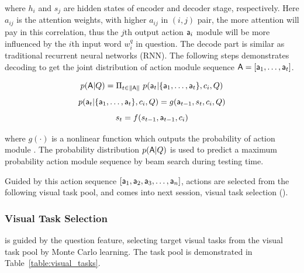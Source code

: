 \noindent where $h_i$ and $s_j$ are hidden states of encoder and decoder stage, respectively. Here $a_{ij}$ is the attention weights, with higher $a_{ij}$ in $(i, j)$ pair, the more attention will pay in this correlation, thus the $j$th output action ${\mathsf{a}}_i$ module will be more influenced by the $i$th input word $w_i^q$ in question. The decode part is similar as traditional recurrent neural networks (RNN). The following steps demonstrates decoding to get the joint distribution of action module sequence ${\mathsf{A}} = [{\mathsf{a}}_1,\dots,{\mathsf{a}}_t]$.

\begin{small}
\begin{equation} 
    p({\mathsf{A}}|Q) = \Pi_{t\in\|{\mathsf{A}}\|}~p({\mathsf{a}}_t|\{{\mathsf{a}}_1,\dots,{\mathsf{a}}_t\},c_i,Q)
\end{equation}
\begin{equation} 
    p({\mathsf{a}}_t|\{{\mathsf{a}}_1,\dots,{\mathsf{a}}_t\},c_i,Q)= g({\mathsf{a}}_{t-1},s_t,c_i,Q)
\end{equation}
\begin{equation} 
    s_t = f(s_{t-1},{\mathsf{a}}_{t-1},c_i)
\end{equation}
\end{small}
\noindent where $g(\cdot)$ is a nonlinear function which outputs the probability of action module . The probability distribution $p({\mathsf{A}}|Q)$ is used to predict a maximum probability action module sequence by beam search during testing time.

Guided by this action sequence $[{\mathsf{a}}_1,{\mathsf{a}}_2,{\mathsf{a}}_3,\dots,{\mathsf{a}}_n]$, actions are selected from the following visual task pool, and comes into next session, visual task selection ().


\subsubsection{Visual Task Selection}
\label{sec-VTS}
\hspace{\parindent} is guided by the question feature, selecting target visual tasks from the visual task pool by Monte Carlo learning. The task pool is demonstrated in Table~\ref{table:visual_tasks}.


